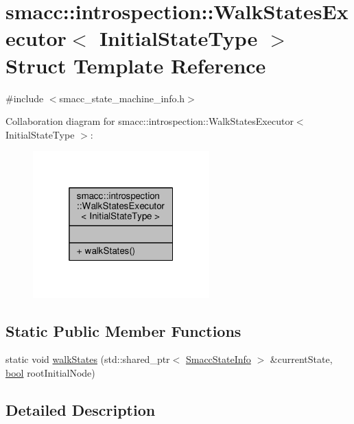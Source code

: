 \hypertarget{structsmacc_1_1introspection_1_1WalkStatesExecutor}{}\section{smacc\+:\+:introspection\+:\+:Walk\+States\+Executor$<$ Initial\+State\+Type $>$ Struct Template Reference}
\label{structsmacc_1_1introspection_1_1WalkStatesExecutor}


{\ttfamily \#include $<$smacc\+\_\+state\+\_\+machine\+\_\+info.\+h$>$}



Collaboration diagram for smacc\+:\+:introspection\+:\+:Walk\+States\+Executor$<$ Initial\+State\+Type $>$\+:\nopagebreak
\begin{figure}[H]
\begin{center}
\leavevmode
\includegraphics[width=193pt]{structsmacc_1_1introspection_1_1WalkStatesExecutor__coll__graph}
\end{center}
\end{figure}
\subsection*{Static Public Member Functions}
\begin{DoxyCompactItemize}
\item 
static void \hyperlink{structsmacc_1_1introspection_1_1WalkStatesExecutor_a21848ccc6e7a7ddee0ccfff97e550ec6}{walk\+States} (std\+::shared\+\_\+ptr$<$ \hyperlink{classsmacc_1_1introspection_1_1SmaccStateInfo}{Smacc\+State\+Info} $>$ \&current\+State, \hyperlink{classbool}{bool} root\+Initial\+Node)
\end{DoxyCompactItemize}


\subsection{Detailed Description}
